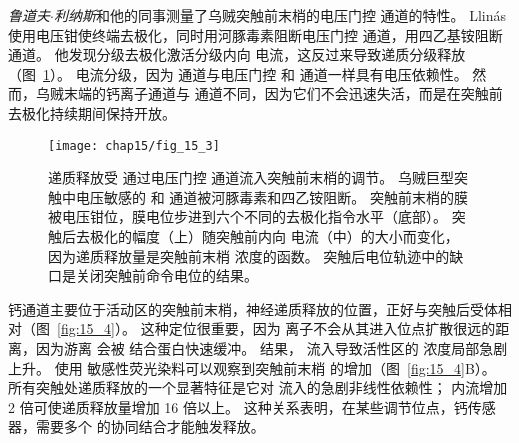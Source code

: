 \textit{鲁道夫$\cdot$利纳斯}和他的同事测量了乌贼突触前末梢的电压门控  通道的特性。
Llinás 使用电压钳使终端去极化，同时用河豚毒素阻断电压门控  通道，用四乙基铵阻断  通道。
他发现分级去极化激活分级内向  电流，这反过来导致递质分级释放（图~\ref{fig:15_3}）。
 电流分级，因为  通道与电压门控  和  通道一样具有电压依赖性。
然而，乌贼末端的钙离子通道与  通道不同，因为它们不会迅速失活，而是在突触前去极化持续期间保持开放。


\begin{figure}[htbp]
	\centering
	\texttt{[image: chap15/fig\_15\_3]}
	\caption{递质释放受  通过电压门控  通道流入突触前末梢的调节。
	乌贼巨型突触中电压敏感的  和  通道被河豚毒素和四乙铵阻断。
	突触前末梢的膜被电压钳位，膜电位步进到六个不同的去极化指令水平（底部）。
	突触后去极化的幅度（上）随突触前内向  电流（中）的大小而变化，因为递质释放量是突触前末梢  浓度的函数。
	突触后电位轨迹中的缺口是关闭突触前命令电位的结果\cite{llinas1977depolarization}。}
	\label{fig:15_3}
\end{figure}


钙通道主要位于活动区的突触前末梢，神经递质释放的位置，正好与突触后受体相对（图~\ref{fig:15_4}）。 
这种定位很重要，因为  离子不会从其进入位点扩散很远的距离，因为游离  会被  结合蛋白快速缓冲。 
结果， 流入导致活性区的  浓度局部急剧上升。 
使用  敏感性荧光染料可以观察到突触前末梢  的增加（图~\ref{fig:15_4}B）。
所有突触处递质释放的一个显著特征是它对  流入的急剧非线性依赖性；
 内流增加 2 倍可使递质释放量增加 16 倍以上。 
这种关系表明，在某些调节位点，钙传感器，需要多个  的协同结合才能触发释放。


